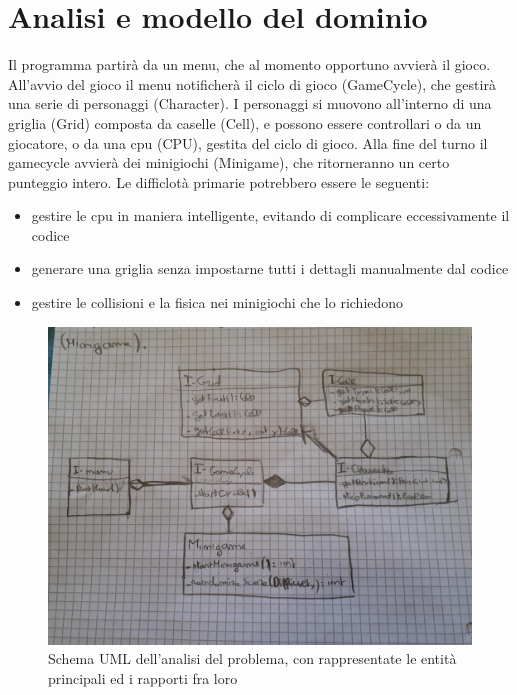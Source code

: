 \documentclass[a4paper,12pt]{report}
\begin{document}
\section{Analisi e modello del dominio}

Il programma partirà da un menu, che al momento opportuno avvierà il gioco.
%
All'avvio del gioco il menu notificherà il ciclo di gioco (GameCycle), che gestirà una serie di personaggi (Character).
%
I personaggi si muovono all'interno di una griglia (Grid) composta da caselle (Cell), e possono essere controllari o da un giocatore, o da una cpu (CPU), gestita del ciclo di gioco.
%
Alla fine del turno il gamecycle avvierà dei minigiochi (Minigame), che ritorneranno un certo punteggio intero.
%
Le difficlotà primarie potrebbero essere le seguenti:
\begin{itemize}
    \item gestire le cpu in maniera intelligente, evitando di complicare eccessivamente il codice
    \item generare una griglia senza impostarne tutti i dettagli manualmente dal codice
    \item gestire le collisioni e la fisica nei minigiochi che lo richiedono
\end{itemize}

\begin{figure}[!t]
\centering{}
\includegraphics[width=150mm]{images/domain.jpeg}
\caption{Schema UML dell'analisi del problema, con rappresentate le entità principali ed i rapporti fra loro}
\label{img:analysis}
\end{figure}
\end{document}
